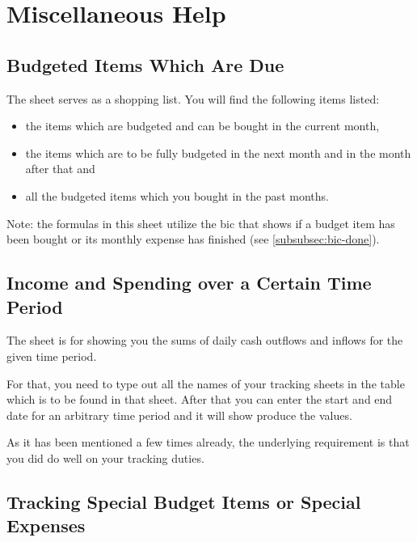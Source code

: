 \section{Miscellaneous Help}
\label{sec:miscellaneous-help}

\subsection{Budgeted Items Which Are Due}
\label{subsec:budgeted-items-which-are-due}

The sheet  serves as a shopping list.
You will find the following items listed:
\begin{itemize}
	\item the items which are budgeted and can be bought in the current month,
	\item the items which are to be fully budgeted in the next month and in the month after that and
	\item all the budgeted items which you bought in the past months.
\end{itemize}

Note: the formulas in this sheet utilize the \ac{bic}  that shows if a budget item has been bought or its monthly expense has finished (see \autoref{subsubsec:bic-done}).

\subsection{Income and Spending over a Certain Time Period}
\label{subsec:income-and-spending-certain-time-period}

The sheet  is for showing you the sums of daily cash outflows and inflows for the given time period.

For that, you need to type out all the names of your tracking sheets in the table which is to be found in that sheet.
After that you can enter the start and end date for an arbitrary time period and it will show produce the values.

As it has been mentioned a few times already, the underlying requirement is that you did do well on your tracking duties.

\subsection{Tracking Special Budget Items or Special Expenses}
\label{subsec:tracking-special-expenses}

